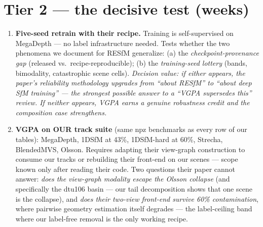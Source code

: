 \documentclass[11pt]{article}
\begin{document}
\section*{Tier 2 --- the decisive test (weeks)}
\begin{enumerate}[leftmargin=1.6em,itemsep=4pt,resume]
\item \textbf{Five-seed retrain with their recipe.} Training is self-supervised on
MegaDepth --- no label infrastructure needed. Tests whether the two phenomena we
document for RESfM generalize: (a) the \emph{checkpoint-provenance gap} (released vs.\
recipe-reproducible); (b) the \emph{training-seed lottery} (bands, bimodality,
catastrophic scene cells). \emph{Decision value: if either appears, the paper's
reliability methodology upgrades from ``about RESfM'' to ``about deep SfM training'' ---
the strongest possible answer to a ``VGPA supersedes this'' review. If neither appears,
VGPA earns a genuine robustness credit and the composition case strengthens.}
\item \textbf{VGPA on OUR track suite} (same npz benchmarks as every row of our tables):
MegaDepth, 1DSfM at 43\%, 1DSfM-hard at 60\%, Strecha, BlendedMVS, Olsson. Requires
adapting their view-graph construction to consume our tracks or rebuilding their
front-end on our scenes --- scope known only after reading their code. Two questions
their paper cannot answer: \emph{does the view-graph modality escape the Olsson
collapse} (and specifically the dtu106 basin --- our tail decomposition shows that one
scene is the collapse), and \emph{does their two-view front-end survive 60\%
contamination}, where pairwise geometry estimation itself degrades --- the label-ceiling
band where our label-free removal is the only working recipe.
\end{enumerate}
\end{document}
